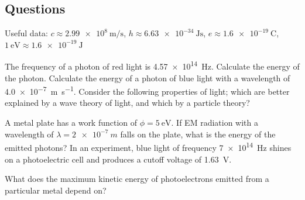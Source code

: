 \documentclass[answers]{exam}
\theoremstyle{definition}
\begin{document}
\subsection*{Questions}
Useful data: $ c \approx \SI{2.99e8}{\metre\per\second} $, $ h \approx \SI{6.63e-34}{\joule\second} $,
$ e \approx \SI{1.6e-19}{\coulomb} $, $ \SI{1}{\electronvolt} \approx \SI{1.6e-19}{\joule} $

\begin{questions}
  \question The frequency of a photon of red light is \SI{4.57e14}{\hertz}. Calculate the energy of the photon.
  \question Calculate the energy of a photon of blue light with a wavelength of \SI{4.0e-7}{\metre\per\second}.
  \question Consider the following properties of light; which are better explained by a wave theory of light, and
            which by a particle theory?
  \question A metal plate has a work function of $ \phi = \SI{5}{\electronvolt} $. If EM radiation
            with a wavelength of $ \lambda = \SI{2e-7}{m} $ falls on the plate, what is the energy
            of the emitted photons?
  \question In an experiment, blue light of frequency \SI{7e14}{\hertz} shines on a photoelectric
            cell and produces a cutoff voltage of \SI{1.63}{\volt}.
  \question What does the maximum kinetic energy of photoelectrons emitted from a particular
            metal depend on?
\end{questions}
\end{document}
